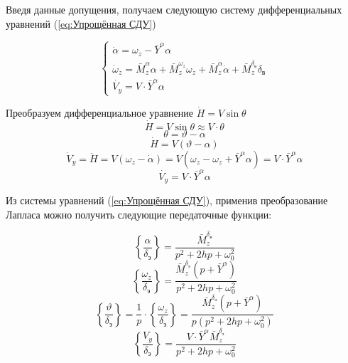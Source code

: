 Введя данные допущения, получаем следующую систему дифференциальных уравнений (\ref{eq:Упрощённая СДУ})

\begin{equation}
    \label{eq:Упрощённая СДУ}
    \begin{cases}
        \dot{\alpha}=\omega_z-\bar{Y}^{\alpha} \alpha \\
        \dot{\omega}_z=\bar{M}_z^{\alpha} \alpha+\bar{M}_z^{\omega_z} \omega_z +\bar{M}_z^{\dot{\alpha}} \dot{\alpha}+\bar{M}_z^{\delta_{\text{в}}} \delta_{\text{в}} \\
        \dot{V_y}=V \cdot \bar{Y}^{\alpha} \alpha
    \end{cases}
\end{equation}

Преобразуем дифференциальное уравнение $\dot{H}=V\sin{\theta}$ 
$$\dot{H}=V\sin{\theta} \approx V \cdot \theta $$
$$\theta = \vartheta - \alpha$$
$$\dot{H}=V(\vartheta - \alpha)$$
$$\dot{V}_y =\ddot{H}=V(\omega_z - \dot{\alpha})=V(\omega_z-\omega_z+\bar{Y}^{\alpha} \alpha)=V \cdot \bar{Y}^{\alpha} \alpha$$
\begin{equation}
    \dot{V_y}=V \cdot \bar{Y}^{\alpha} \alpha
\end{equation}

Из системы уравнений (\ref{eq:Упрощённая СДУ}), применив преобразование Лапласа можно получить следующие передаточные функции:

\begin{equation}
    \label{eq:ПФ угл атаки}
   \left \{ \frac{\alpha}{\delta_\text{э}} \right \}
    =\frac{\bar{M}_z^{\delta_{\text{в}}}}{p^2+2hp+\omega_0^2}
\end{equation}
\begin{equation}
    \label{eq:ПФ угловой скорости тангажа}
   \left \{ \frac{\omega_z}{\delta_\text{э}} \right \}
    =\frac{\bar{M}_z^{\delta_{\text{э}}}(p+\bar{Y}^{\alpha})}{p^2+2hp+\omega_0^2}
\end{equation}
\begin{equation}
    \label{eq:ПФ угл тангажа}
    \left \{ \frac{\vartheta}{\delta_\text{э}} \right \}=\frac{1}{p} \cdot \left \{ \frac{\omega_z}{\delta_\text{э}} \right \}=\frac{\bar{M}_z^{\delta_{\text{э}}}(p+\bar{Y}^{\alpha})}{ p (p^2+2hp+\omega_0^2)}
\end{equation}
\begin{equation}
    \label{eq:ПФ вертикальная скорость}
   \left \{ \frac{V_y}{\delta_\text{э}} \right \}
    = \frac{V \cdot \bar{Y}^{\alpha}\bar{M}_z^{\delta_{\text{э}}}}{p^2+2hp+\omega_0^2}
\end{equation}

